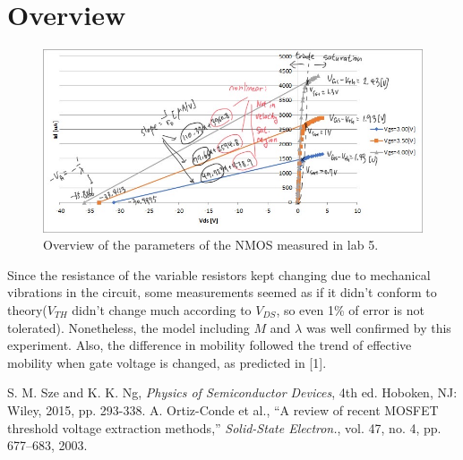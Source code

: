 \documentclass[a4paper, itemph]{oblivoir}
\theoremstyle{definition}
\begin{document}
\section{Overview}
\begin{figure}[htb]
    \centering
    \includegraphics[width=0.9\linewidth]{overview.JPG}
    \caption{Overview of the parameters of the NMOS measured in lab 5.}
\end{figure}
Since the resistance of the variable resistors kept changing due to mechanical vibrations in the circuit, some measurements seemed as if it didn't conform to theory($V_{TH}$ didn't change much according to $V_{DS}$, so even 1\% of error is not tolerated). Nonetheless, the model including $M$ and $\lambda$ was well confirmed by this experiment. Also, the difference in mobility followed the trend of effective mobility when gate voltage is changed, as predicted in [1].
\begin{thebibliography}{}

 S. M. Sze and K. K. Ng, \textit{Physics of Semiconductor Devices}, 4th ed. Hoboken, NJ: Wiley, 2015, pp. 293-338.
 A. Ortiz-Conde et al., “A review of recent MOSFET threshold voltage extraction methods,” \textit{Solid-State Electron.}, vol. 47, no. 4, pp. 677–683, 2003.
\end{thebibliography}
\end{document}
